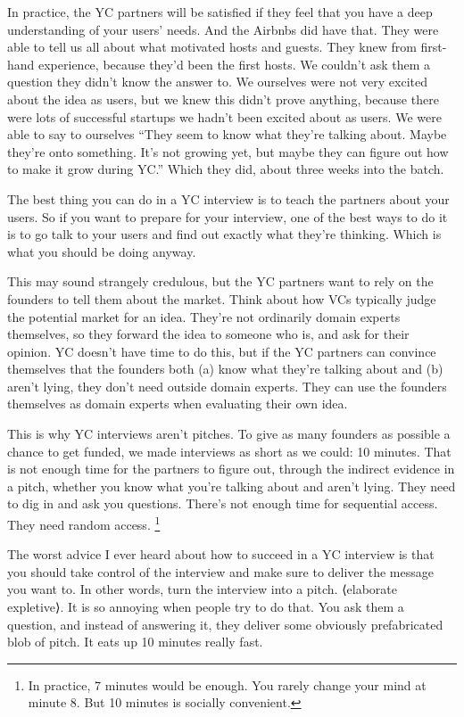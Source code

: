 \documentclass[12pt]{book}
\begin{document}
In practice, the YC partners will be satisfied if they feel that you
have a deep understanding of your users' needs. And the Airbnbs did have
that. They were able to tell us all about what motivated hosts and
guests. They knew from first-hand experience, because they'd been the
first hosts. We couldn't ask them a question they didn't know the answer
to. We ourselves were not very excited about the idea as users, but we
knew this didn't prove anything, because there were lots of successful
startups we hadn't been excited about as users. We were able to say to
ourselves ``They seem to know what they're talking about. Maybe they're
onto something. It's not growing yet, but maybe they can figure out how
to make it grow during YC.'' Which they did, about three weeks into the
batch.

The best thing you can do in a YC interview is to teach the partners
about your users. So if you want to prepare for your interview, one of
the best ways to do it is to go talk to your users and find out exactly
what they're thinking. Which is what you should be doing anyway.

This may sound strangely credulous, but the YC partners want to rely on
the founders to tell them about the market. Think about how VCs
typically judge the potential market for an idea. They're not ordinarily
domain experts themselves, so they forward the idea to someone who is,
and ask for their opinion. YC doesn't have time to do this, but if the
YC partners can convince themselves that the founders both (a) know what
they're talking about and (b) aren't lying, they don't need outside
domain experts. They can use the founders themselves as domain experts
when evaluating their own idea.

This is why YC interviews aren't pitches. To give as many founders as
possible a chance to get funded, we made interviews as short as we
could: 10 minutes. That is not enough time for the partners to figure
out, through the indirect evidence in a pitch, whether you know what
you're talking about and aren't lying. They need to dig in and ask you
questions. There's not enough time for sequential access. They need
random access. \footnote{In practice, 7 minutes would be enough. You rarely change your
mind at minute 8. But 10 minutes is socially convenient.}

The worst advice I ever heard about how to succeed in a YC interview is
that you should take control of the interview and make sure to deliver
the message you want to. In other words, turn the interview into a
pitch. ⟨elaborate expletive⟩. It is so annoying when people try to do
that. You ask them a question, and instead of answering it, they deliver
some obviously prefabricated blob of pitch. It eats up 10 minutes really
fast.
\end{document}
